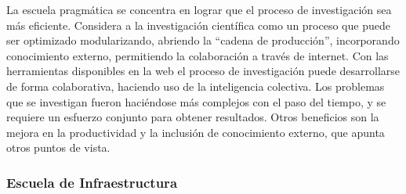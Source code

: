 	La escuela pragmática se concentra en lograr que el proceso de investigación sea más eficiente. Considera a la investigación científica como un proceso que puede ser optimizado modularizando, abriendo la ``cadena de producción'', incorporando conocimiento externo, permitiendo la colaboración a través de internet. Con las herramientas disponibles en la web el proceso de investigación puede desarrollarse de forma colaborativa, haciendo uso de la inteligencia colectiva. Los problemas que se investigan fueron haciéndose más complejos con el paso del tiempo, y se requiere un esfuerzo conjunto para obtener resultados. Otros beneficios son la mejora en la productividad y la inclusión de conocimiento externo, que apunta otros puntos de vista. 
	
\subsubsection{Escuela de Infraestructura} 
		
